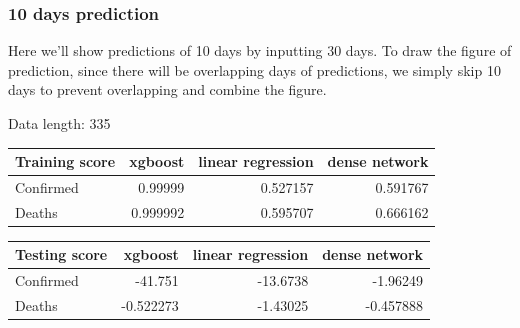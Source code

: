 \documentclass[a4paper,12pt]{article}
\begin{document}
\subsubsection{10 days prediction}
Here we'll show predictions of 10 days by inputting 30 days. To draw the figure of prediction, since there will be overlapping days of predictions, we simply skip 10 days to prevent overlapping and combine the figure.
\begin{tcolorbox}
    Data length:	 335

    \begin{tabular}{lrrr}
    \toprule
    Training score   &   xgboost &   linear regression &   dense network \\
    \midrule
    Confirmed        &  0.99999  &            0.527157 &        0.591767 \\
    Deaths           &  0.999992 &            0.595707 &        0.666162 \\
    \bottomrule
    \end{tabular}


    \begin{tabular}{lrrr}
    \toprule
    Testing score   &    xgboost &   linear regression &   dense network \\
    \midrule
    Confirmed       & -41.751    &           -13.6738  &       -1.96249  \\
    Deaths          &  -0.522273 &            -1.43025 &       -0.457888 \\
    \bottomrule
    \end{tabular}
\end{tcolorbox}
\end{document}
